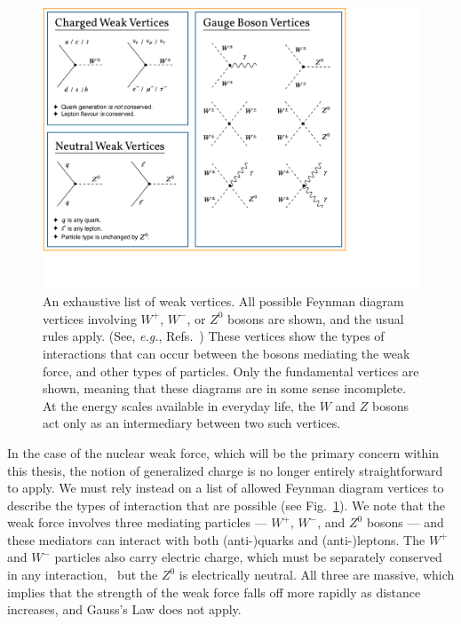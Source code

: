 \begin{figure}[h!t!b!]
	\centering
	\includegraphics[width=1.0\linewidth]{Figures/VertexFeynmanDiagrams.pdf}
	\caption[An exhaustive list of weak vertices]{An exhaustive list of weak vertices.  All possible Feynman diagram vertices involving $W^+$, $W^-$, or $Z^0$ bosons are shown, and the usual rules apply.  (See, \emph{e.g.}, Refs.~\cite{griffiths_particles,peskinandschroeder})  These vertices show the types of interactions that can occur between the bosons mediating the weak force, and other types of particles.  Only the fundamental vertices are shown, meaning that these diagrams are in some sense incomplete.  At the energy scales available in everyday life, the $W$ and $Z$ bosons act only as an intermediary between two such vertices.  
	}	
	\label{fig:feynmandiagrams_general}
\end{figure}

In the case of the nuclear weak force, which will be the primary concern within this thesis, 
the notion of generalized charge is no longer entirely straightforward to apply.
We must rely instead on a list of allowed Feynman diagram vertices to describe the types of interaction that are possible (see Fig.~\ref{fig:feynmandiagrams_general}).  We note that the weak force involves three mediating particles --- $W^+$, $W^-$, and $Z^0$ bosons --- and these mediators can interact with both (anti-)quarks and (anti-)leptons.  The $W^+$ and $W^-$ particles also carry electric charge, which must be separately conserved in any interaction,~ but the $Z^0$ is electrically neutral.  All three are massive, which implies that the strength of the weak force falls off more rapidly as distance increases, and Gauss's Law does not apply. 


